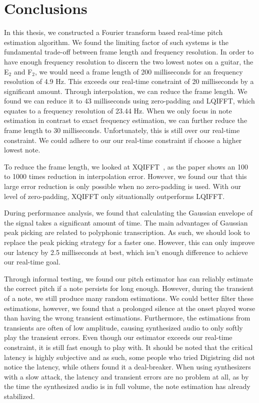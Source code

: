 \documentclass[a4paper,10pt,twocolumn]{article}
\newcommand{\note}[2]{#1${}_{#2}$}
\begin{document}
\section{Conclusions}
In this thesis, we constructed a Fourier transform based real-time pitch estimation algorithm. We found the limiting factor of such systems is the fundamental trade-off between frame length and frequency resolution. In order to have enough frequency resolution to discern the two lowest notes on a guitar, the \note{E}{2} and \note{F}{2}, we would need a frame length of 200 milliseconds for an frequency resolution of 4.9 Hz. This exceeds our real-time constraint of 20 milliseconds by a significant amount. Through interpolation, we can reduce the frame length. We found we can reduce it to 43 milliseconds using zero-padding and LQIFFT, which equates to a frequency resolution of 23.44 Hz. When we only focus in note estimation in contrast to exact frequency estimation, we can further reduce the frame length to 30 milliseconds. Unfortunately, this is still over our real-time constraint. We could adhere to our our real-time constraint if choose a higher lowest note.

To reduce the frame length, we looked at XQIFFT~\cite{interpolnozero}, as the paper shows an 100 to 1000 times reduction in interpolation error. However, we found our that this large error reduction is only possible when no zero-padding is used. With our level of zero-padding, XQIFFT only situationally outperforms LQIFFT.

During performance analysis, we found that calculating the Gaussian envelope of the signal takes a significant amount of time. The main advantages of Gaussian peak picking are related to polyphonic transcription. As such, we should look to replace the peak picking strategy for a faster one. However, this can only improve our latency by 2.5 milliseconds at best, which isn't enough difference to achieve our real-time goal.

Through informal testing, we found our pitch estimator has can reliably estimate the correct pitch if a note persists for long enough. However, during the transient of a note, we still produce many random estimations. We could better filter these estimations, however, we found that a prolonged silence at the onset played worse than having the wrong transient estimations. Furthermore, the estimations from transients are often of low amplitude, causing synthesized audio to only softly play the transient errors. Even though our estimator exceeds our real-time constraint, it is still fast enough to play with. It should be noted that the critical latency is highly subjective and as such, some people who tried Digistring did not notice the latency, while others found it a deal-breaker. When using synthesizers with a slow attack, the latency and transient errors are no problem at all, as by the time the synthesized audio is in full volume, the note estimation has already stabilized.
\end{document}
